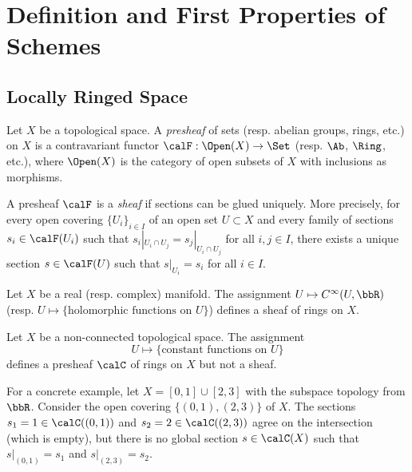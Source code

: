 \section{Definition and First Properties of Schemes}


\subsection{Locally Ringed Space}

    \begin{definition}\label{def:sheaves}
        Let \(X\) be a topological space.
        A \emph{presheaf} of sets (resp. abelian groups, rings, etc.) on \(X\) is a contravariant functor \(\calF : \Open(X) \to \Set\) (resp. \(\Ab\), \(\Ring\), etc.), 
        where \(\Open(X)\) is the category of open subsets of \(X\) with inclusions as morphisms.

        A presheaf \(\calF\) is a \emph{sheaf} if sections can be glued uniquely.
        More precisely, for every open covering \(\{U_i\}_{i \in I}\) of an open set \(U \subset X\) and every family of sections \(s_i \in \calF(U_i)\) such that \(s_i|_{U_i \cap U_j} = s_j|_{U_i \cap U_j}\) for all \(i,j \in I\),
        there exists a unique section \(s \in \calF(U)\) such that \(s|_{U_i} = s_i\) for all \(i \in I\).
    \end{definition}

    \begin{example}\label{eg:sheaf_of_smooth_and_analytic_functions}
        Let \(X\) be a real (resp. complex) manifold.
        The assignment \(U \mapsto C^\infty(U, \bbR)\) (resp. \(U \mapsto \{\text{holomorphic functions on }U\}\)) defines a sheaf of rings on \(X\).
    \end{example}

    \begin{example}\label{eg:presheaf_but_not_sheaf}
        Let \(X\) be a non-connected topological space.
        The assignment 
        \[U \mapsto \{\text{constant functions on }U\}\] 
        defines a presheaf \(\calC\) of rings on \(X\) but not a sheaf.

        For a concrete example, let \(X = [0,1]\cup [2,3]\) with the subspace topology from \(\bbR\).
        Consider the open covering \(\{(0,1), (2,3)\}\) of \(X\).
        The sections \(s_1 = 1 \in \calC((0,1))\) and \(s_2 = 2 \in \calC((2,3))\) agree on the intersection (which is empty), 
        but there is no global section \(s \in \calC(X)\) such that \(s|_{(0,1)} = s_1\) and \(s|_{(2,3)} = s_2\).
    \end{example}

